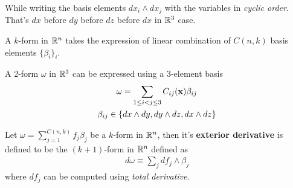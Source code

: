 \documentclass[11pt]{article}
\begin{document}
			\begin{remark}
				While writing the basis elements $dx_i \land dx_j$ with the variables in \emph{cyclic order}. That's $dx$ before $dy$ before $dz$ before $dx$ in $\mathbb{R}^3$ case.
			\end{remark}
			
			\begin{definition}
				A $k$-form in $\mathbb{R}^n$ takes the expression of linear combination of $C(n, k)$ basis elements $\{\beta_i\}_i$.
			\end{definition}
			
			\begin{example}
				A 2-form $\omega$ in $\mathbb{R}^3$ can be expressed using a 3-element basis 
				\begin{gather}
					\omega = \sum_{1 \leq i < j \leq 3} C_{ij}(\textbf{x}) \beta_{ij} \\
					\beta_{ij} \in \{dx \land dy, dy \land dz, dx \land dz\}
				\end{gather}
			\end{example}
			
			\begin{definition}
				Let $\omega = \sum_{j=1}^{C(n,k)} f_j \beta_j$ be a $k$-form in $\mathbb{R}^n$, then it's \textbf{exterior derivative} is defined to be the $(k+1)$-form in $\mathbb{R}^n$ defined as 
				\begin{gather}
					d\omega \equiv \sum_{j} df_j \land \beta_j
				\end{gather}
				where $df_j$ can be computed using \emph{total derivative}.
			\end{definition}
			
\end{document}
